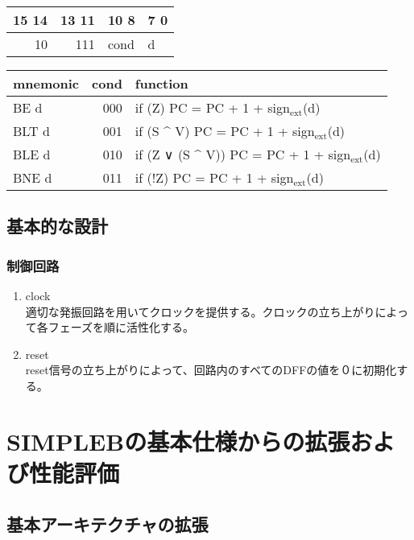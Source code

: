 \documentclass{jarticle}
\begin{document}
\begin{enumerate}
\begin{center}
\begin{tabular}{rrll}
\hline
15 14 & 13 11 & 10 8 & 7 0\\
\hline
10 & 111 & cond & d\\
\hline
\end{tabular}
\end{center}

\begin{center}
\begin{tabular}{lrl}
\hline
mnemonic & cond & function\\
\hline
BE d & 000 & if (Z) PC = PC + 1 + sign$_{\text{ext}}$(d)\\
\hline
BLT d & 001 & if (S \^{} V) PC = PC + 1 + sign$_{\text{ext}}$(d)\\
\hline
BLE d & 010 & if (Z ∨ (S \^{} V)) PC = PC + 1 + sign$_{\text{ext}}$(d)\\
\hline
BNE d & 011 & if (!Z) PC = PC + 1 + sign$_{\text{ext}}$(d)\\
\hline
\end{tabular}
\end{center}
\end{enumerate}


\subsection{基本的な設計}
\label{sec-1-5}
\subsubsection{制御回路}
\label{sec-1-5-1}
\begin{enumerate}
\item clock\\
\label{sec-1-5-1-1}
適切な発振回路を用いてクロックを提供する。クロックの立ち上がりによって各フェーズを順に活性化する。
\item reset\\
\label{sec-1-5-1-2}
reset信号の立ち上がりによって、回路内のすべてのDFFの値を０に初期化する。
\end{enumerate}

\section{SIMPLEBの基本仕様からの拡張および性能評価}
\label{sec-2}
\subsection{基本アーキテクチャの拡張}
\label{sec-2-1}
\end{document}
